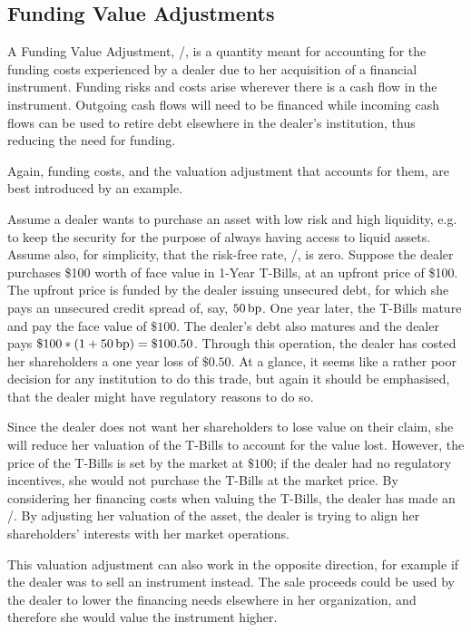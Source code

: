\documentclass[main.tex]{subfiles}
\begin{document}
    \subsection{Funding Value Adjustments}
        A Funding Value Adjustment, \FVA/, is a quantity meant for accounting for the funding costs 
        experienced by a dealer due to her acquisition of a financial instrument.
        Funding risks and costs arise wherever there is a cash flow in the instrument. 
        Outgoing cash flows will need to be financed while incoming cash flows
        can be used to retire debt elsewhere in the dealer's institution, 
        thus reducing the need for funding.

        Again, funding costs, and the valuation adjustment that accounts for them,
        are best introduced by an example.

        \begin{example}
        Assume a dealer wants to purchase an asset with low risk and high liquidity, 
        e.g. to keep the security for the purpose of always having access to liquid assets.
        Assume also, for simplicity, that the risk-free rate, \OIS/, is zero.
        Suppose the dealer purchases \$100 worth of face value in 1-Year T-Bills,
        at an upfront price of \$100. 
        The upfront price is funded by the dealer issuing unsecured debt, 
        for which she pays an unsecured credit spread of, say, $50\,\text{bp}$.
        One year later, the T-Bills mature and pay the face value of $\$100$.
        The dealer's debt also matures and the dealer pays $\$100 * (1 + 50\,\text{bp}) = \$100.50$.
        Through this operation, the dealer has costed her shareholders a one year loss of $\$0.50$.
        At a glance, it seems like a rather poor decision for any institution to do this trade,
        but again it should be emphasised, that the dealer might have regulatory reasons to do so.

        Since the dealer does not want her shareholders to lose value on their claim,
        she will reduce her valuation of the T-Bills to account for the value lost.
        However, the price of the T-Bills is set by the market at $\$100$;
        if the dealer had no regulatory incentives, 
        she would not purchase the T-Bills at the market price. 
        By considering her financing costs when valuing the T-Bills, 
        the dealer has made an \FVA/.
        By adjusting her valuation of the asset, 
        the dealer is trying to align her shareholders' interests with her market operations.
        
        This valuation adjustment can also work in the opposite direction, 
        for example if the dealer was to sell an instrument instead.
        The sale proceeds could be used by the dealer 
        to lower the financing needs elsewhere in her organization,
        and therefore she would value the instrument higher. 
        \end{example}
        
\end{document}

